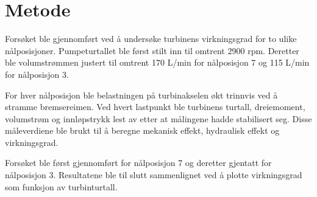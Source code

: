 \section*{Metode}
\setcounter{section}{4}

\setcounter{subsection}{0}

Forsøket ble gjennomført ved å undersøke turbinens virkningsgrad for to ulike nålposisjoner. Pumpeturtallet ble først stilt inn til omtrent 2900 rpm. Deretter ble volumstrømmen justert til omtrent 170 L/min for nålposisjon 7 og 115 L/min for nålposisjon 3.

For hver nålposisjon ble belastningen på turbinakselen økt trinnvis ved å stramme bremsereimen. Ved hvert lastpunkt ble turbinens turtall, dreiemoment, volumstrøm og innløpstrykk lest av etter at målingene hadde stabilisert seg. Disse måleverdiene ble brukt til å beregne mekanisk effekt, hydraulisk effekt og virkningsgrad.

Forsøket ble først gjennomført for nålposisjon 7 og deretter gjentatt for nålposisjon 3. Resultatene ble til slutt sammenlignet ved å plotte virkningsgrad som funksjon av turbinturtall.
